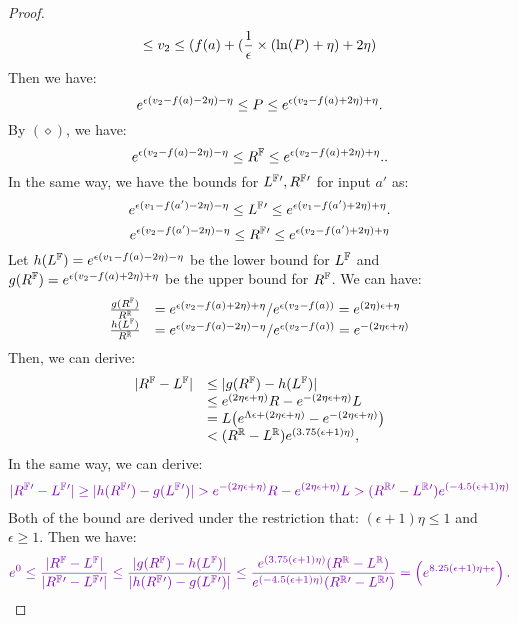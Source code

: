 \documentclass[a4paper,11pt]{article}
\begin{document}
\begin{proof}
{\[		\leq v_2 \leq
		(f(a) + 
		(\frac{1}{\epsilon} \times (\ln(P) + \eta ) + 2 \eta)
		\]
		Then we have:
		$$
		e^{\epsilon 
		 (v_2 - f(a) - 2\eta) - \eta}
		\leq P \leq
		e^{\epsilon 
		(v_2 - f(a) + 2\eta) + \eta}.
$$
		By $(\diamond)$, we have:
		$$
		e^{\epsilon 
		 (v_2 - f(a) - 2\eta) - \eta}
		\leq R^{\mathbb{F}} \leq
		e^{\epsilon 
		(v_2 - f(a) + 2\eta) + \eta}.
		.$$	
%
		In the same way, we have the bounds for $L^{\mathbb{F}}{'}, R^{\mathbb{F}}{'}$ for input $a'$ as:
%
		$$e^{\epsilon 
		 (v_1 - f(a') - 2\eta) - \eta}
		\leq L^{\mathbb{F}}{'} \leq
		e^{\epsilon 
		(v_1 - f(a') + 2\eta) + \eta}.$$
		$$ 
		e^{\epsilon 
		 (v_2 - f(a') - 2\eta) - \eta}
		\leq R^{\mathbb{F}}{'} \leq
		e^{\epsilon 
		(v_2 - f(a') + 2\eta) + \eta}$$
%
		Let  
		$h{(L^{\mathbb{F}}) } = e^{\epsilon 
		 (v_1 - f(a) - 2\eta) - \eta}$ 
		 be the lower bound for $L^{\mathbb{F}}$
		and $g(R^{\mathbb{F}}) = e^{\epsilon 
		(v_2 - f(a) + 2\eta) + \eta}$ 
		be the upper bound for $R^{\mathbb{F}}$.
		We can have:
		\[
		\begin{array}{ll}
		\frac{g(\fvalR)}{\rvarR} 
		& = e^{\epsilon 
		(\valv_2 - f(a) + 2\eta) + \eta}/e^{\epsilon(\valv_2 - f(a))}
		 =
		e^{ 
		(2\eta)\epsilon + \eta}
		\\
%
		\frac{h(\fvalL )}{\rvarR} 
		& = e^{\epsilon 
		(\valv_2 - f(a) - 2\eta) - \eta}/e^{\epsilon(\valv_2 - f(a))}
		 =
		e^{ 
		-(2\eta\epsilon + \eta)}
		\end{array}
		\]
		Then, we can derive:
		\[
		\begin{array}{ll}
		|R^{\mathbb{F}} - L^{\mathbb{F}}|
		& \leq |g(R^{\mathbb{F}} ) - h(L^{\mathbb{F}} )| \\
		& \leq e^{ 
		(2\eta \epsilon + \eta)}R - 
		e^{-(2\eta\epsilon + \eta)} L \\
		& = L \big(  e^{ \Lambda\epsilon + (2\eta \epsilon + \eta)} 
		- e^{-(2\eta \epsilon + \eta)} \big)\\
		& < (R^{\mathbb{R}} - L^{\mathbb{R}})
		e^{(3.75(\epsilon + 1) \eta )},
		\end{array}
		\]
		In the same way, we can derive:
		\[
		\extend{
		|\fvarR{'} - \fvalL{'}|
		\geq 
		|h(\fvalR{'} ) - g(\fvalL{'} )|
		 > e^{-(2\eta \epsilon + \eta)} R 
		 - e^{(2\eta \epsilon + \eta)} L
		> (\rvalR{'} - \rvalL{'})
		e^{(-4.5(\epsilon + 1) \eta)}
		}
		\]
		Both of the bound are derived under the restriction that: $(\epsilon + 1) \eta \leq 1$ and $\epsilon \geq 1$.
		Then we have:
		\[
		\extend{
		e^0 \leq 
		\frac{|\fvalR - \fvalL |}
		{|\fvalR{'} - \fvalL{'}|}
		\leq
		\frac{|g(\fvalR ) - h(\fvalL )|}
		{|h(\fvalR{'} ) - g(\fvalL{'} )|}
		\leq 
		\frac{e^{(3.75(\epsilon + 1) \eta )}(\rvalR - \rvalL) }
		{e^{(-4.5(\epsilon + 1) \eta)} (\rvalR{'} - \rvalL{'})}
		=
		\left(
		e^{8.25( \epsilon + 1) \eta + \epsilon}
		\right).
		}		
		\]
		}
%
\end{proof}




\newpage


\end{document}
